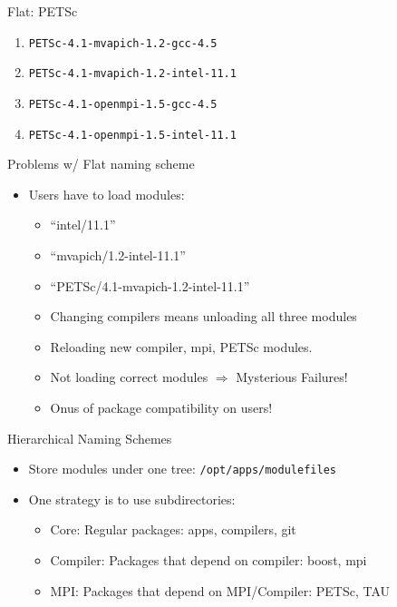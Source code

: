 \documentclass{beamer}
\begin{document}
\begin{frame}{Flat: PETSc }
  \begin{enumerate}
  \item \texttt{PETSc-4.1-mvapich-1.2-gcc-4.5}
  \item \texttt{PETSc-4.1-mvapich-1.2-intel-11.1}
  \item \texttt{PETSc-4.1-openmpi-1.5-gcc-4.5}
  \item \texttt{PETSc-4.1-openmpi-1.5-intel-11.1}
  \end{enumerate}
\end{frame}

\begin{frame}{Problems w/ Flat naming scheme}
  \begin{itemize}
    \item Users have to load modules:
      \begin{itemize}
        \item ``intel/11.1''
        \item ``mvapich/1.2-intel-11.1''
        \item ``PETSc/4.1-mvapich-1.2-intel-11.1''
        \item Changing compilers means unloading all three modules
        \item Reloading new compiler, mpi, PETSc modules.
        \item Not loading correct modules $\Rightarrow$ Mysterious Failures!
        \item Onus of package compatibility on users! 
      \end{itemize}
  \end{itemize}
\end{frame}


\begin{frame}{Hierarchical Naming Schemes}
  \begin{itemize}
    \item Store modules under one tree: \texttt{/opt/apps/modulefiles}
    \item One strategy is to use subdirectories:
      \begin{itemize}
        \item Core: Regular packages: apps, compilers, git
        \item Compiler: Packages that depend on compiler: boost, mpi
        \item MPI: Packages that depend on MPI/Compiler: PETSc, TAU
      \end{itemize}

  \end{itemize}
\end{frame}
\end{document}
